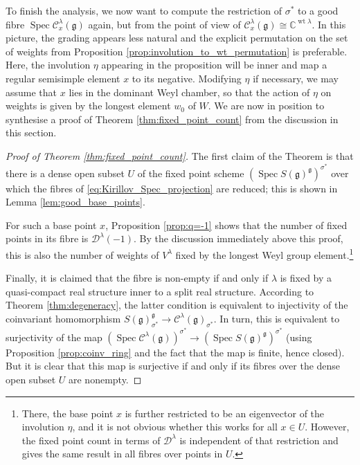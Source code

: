 \documentclass{amsart}
\newcommand{\C}{\mathbb{C}}
\newcommand{\Kir}{\mathcal{C}}
\newcommand{\D}{\mathcal{D}}
\newcommand{\g}{\mathfrak{g}}
\newcommand{\Spec}{\operatorname{Spec}}
\newcommand{\wt}{\operatorname{wt}}
\theoremstyle{definition}
\theoremstyle{plain}
\theoremstyle{remark}
\begin{document}
To finish the analysis, we now want to compute the restriction of $\sigma^*$ to a good fibre $\Spec \Kir^\lambda_x(\g)$ again, but from the point of view of $\Kir^\lambda_x(\g) \cong \C^{\wt{\lambda}}$. In this picture, the grading appears less natural and the explicit permutation on the set of weights from Proposition \ref{prop:involution_to_wt_permutation} is preferable. Here, the involution $\eta$ appearing in the proposition will be inner and map a regular semisimple element $x$ to its negative. Modifying $\eta$ if necessary, we may assume that $x$ lies in the dominant Weyl chamber, so that the action of $\eta$ on weights is given by the longest element $w_0$ of $W$. We are now in position to synthesise a proof of Theorem \ref{thm:fixed_point_count} from the discussion in this section.

\begin{proof}[Proof of Theorem \ref{thm:fixed_point_count}]
    The first claim of the Theorem is that there is a dense open subset $U$ of the fixed point scheme $(\Spec S(\g)^\g)^{\sigma^*}$ over which the fibres of \eqref{eq:Kirillov_Spec_projection} are reduced; this is shown in Lemma \ref{lem:good_base_points}. 
    
    For such a base point $x$, Proposition \ref{prop:q=-1} shows that the number of fixed points in its fibre is $\D^\lambda(-1)$. By the discussion immediately above this proof, this is also the number of weights of $V^\lambda$ fixed by the longest Weyl group element.\footnote{There, the base point $x$ is further restricted to be an eigenvector of the involution $\eta$, and it is not obvious whether this works for all $x\in U$. However, the fixed point count in terms of $\D^\lambda$ is independent of that restriction and gives the same result in all fibres over points in $U$.}

    Finally, it is claimed that the fibre is non-empty if and only if $\lambda$ is fixed by a quasi-compact real structure inner to a split real structure. According to Theorem \ref{thm:degeneracy}, the latter condition is equivalent to injectivity of the coinvariant homomorphism $S(\g)^\g_{\sigma^*} \to \Kir^\lambda(\g)_{\sigma^*}$. In turn, this is equivalent to surjectivity of the map $(\Spec \Kir^\lambda(\g))^{\sigma^*}\to (\Spec S(\g)^\g)^{\sigma^*}$ (using Proposition \ref{prop:coinv_ring} and the fact that the map is finite, hence closed). But it is clear that this map is surjective if and only if its fibres over the dense open subset $U$ are nonempty.
\end{proof}
\end{document}
